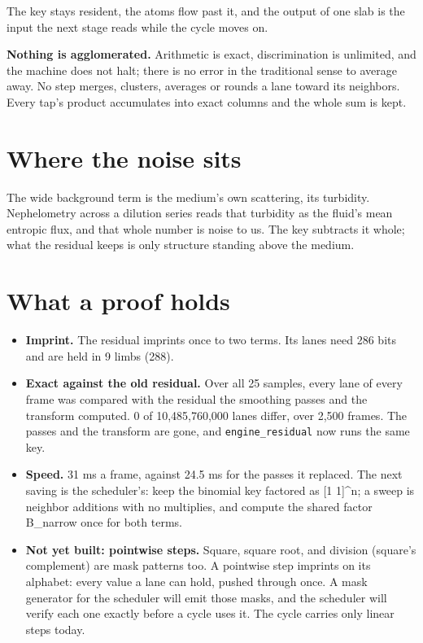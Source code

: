 The key stays resident, the atoms flow past it, and the output of one slab is the input the next stage reads while the cycle moves on.

\textbf{Nothing is agglomerated.} Arithmetic is exact, discrimination is unlimited, and the machine does not halt; there is no error in the traditional sense to average away. No step merges, clusters, averages or rounds a lane toward its neighbors. Every tap's product accumulates into exact columns and the whole sum is kept.

\section{\texorpdfstring{Where the noise sits}{Where the noise sits}}

The wide background term is the medium's own scattering, its turbidity. Nephelometry across a dilution series reads that turbidity as the fluid's mean entropic flux, and that whole number is noise to us. The key subtracts it whole; what the residual keeps is only structure standing above the medium.

\section{\texorpdfstring{What a proof holds}{What a proof holds}}

\begin{itemize}
\item \textbf{Imprint.} The residual imprints once to two terms. Its lanes need 286 bits and are held in 9 limbs (288).
\item \textbf{Exact against the old residual.} Over all 25 samples, every lane of every frame was compared with the residual the smoothing passes and the transform computed. 0 of 10,485,760,000 lanes differ, over 2,500 frames. The passes and the transform are gone, and \texttt{engine\_\allowbreak{}residual} now runs the same key.
\item \textbf{Speed.} 31 ms a frame, against 24.5 ms for the passes it replaced. The next saving is the scheduler's: keep the binomial key factored as [1 1]\textasciicircum{}n; a sweep is neighbor additions with no multiplies, and compute the shared factor B\_\allowbreak{}narrow once for both terms.
\item \textbf{Not yet built: pointwise steps.} Square, square root, and division (square's complement) are mask patterns too. A pointwise step imprints on its alphabet: every value a lane can hold, pushed through once. A mask generator for the scheduler will emit those masks, and the scheduler will verify each one exactly before a cycle uses it. The cycle carries only linear steps today.
\end{itemize}

